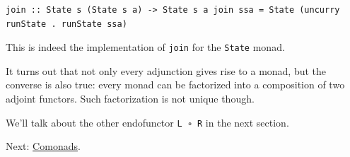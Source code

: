 \begin{verbatim}
join :: State s (State s a) -> State s a join ssa = State (uncurry runState . runState ssa)
\end{verbatim}

This is indeed the implementation of \texttt{join} for the
\texttt{State} monad.

It turns out that not only every adjunction gives rise to a monad, but
the converse is also true: every monad can be factorized into a
composition of two adjoint functors. Such factorization is not unique
though.

We'll talk about the other endofunctor \texttt{L\ ∘\ R} in the next
section.

Next: \href{https://bartoszmilewski.com/2017/01/02/comonads/}{Comonads}.
